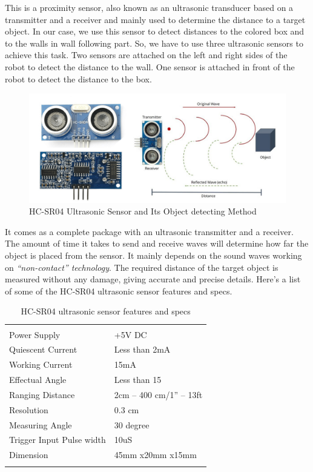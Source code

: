\documentclass[a4paper,11pt,twocolumn]{article}
\begin{document}
This is a proximity sensor, also known as an ultrasonic transducer based on a transmitter and a receiver and mainly used to determine the distance to a target object. In our case, we use this sensor to detect distances to the colored box and to the walls in wall following part. So, we have to use three ultrasonic sensors to achieve this task. Two sensors are attached on the left and right sides of the robot to detect the distance to the wall. One sensor is attached in  front of  the robot to detect the distance to the box.\\
\begin{center}
	\begin{figure}[!h]
		\centering
		\includegraphics[scale=0.4]{figures/ul}
		\caption{HC-SR04 Ultrasonic Sensor and Its Object detecting Method}
	\end{figure}
\end{center}
It comes as a complete package with an ultrasonic transmitter and a receiver. The amount of time it takes to send and receive waves will determine how far the object is placed from the sensor. It mainly depends on the sound waves working on \textit{“non-contact” technology}. The required distance of the target object is measured without any damage, giving accurate and precise details. Here’s a list of some of the HC-SR04 ultrasonic sensor features and specs\cite{noauthor_complete_2018}.

\begin{table}[!h]
	\centering
	
	\begin{tabular}{l l}
		
		&\\
		Power Supply	&		+5V DC\\
		Quiescent Current 	&	 Less than 2mA\\
		Working Current	&	 15mA\\
		Effectual Angle	& Less than 15\degree \\
		Ranging Distance &		2cm – 400 cm/1'' – 13ft\\
		Resolution 		&		 0.3 cm\\
		Measuring Angle	&	 30 degree\\
		Trigger Input Pulse width&10uS\\
		Dimension		&		 45mm x20mm x15mm\\
		&\\
	
	\end{tabular}
	
	\caption{HC-SR04 ultrasonic sensor features and specs}
\end{table}	
	
\end{document}
